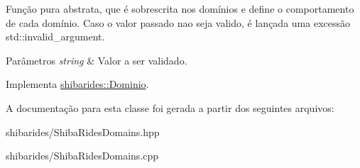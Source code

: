 Função pura abstrata, que é sobrescrita nos domínios e define o comportamento de cada domínio. Caso o valor passado nao seja valido, é lançada uma excessão std\+::invalid\+\_\+argument.


\begin{DoxyParams}{Parâmetros}
{\em string} & Valor a ser validado. \\
\hline
\end{DoxyParams}


Implementa \hyperlink{classshibarides_1_1Dominio_acc9445531455c072bbf708709aebbe55}{shibarides\+::\+Dominio}.



A documentação para esta classe foi gerada a partir dos seguintes arquivos\+:\begin{DoxyCompactItemize}
\item 
shibarides/Shiba\+Rides\+Domains.\+hpp\item 
shibarides/Shiba\+Rides\+Domains.\+cpp\end{DoxyCompactItemize}
